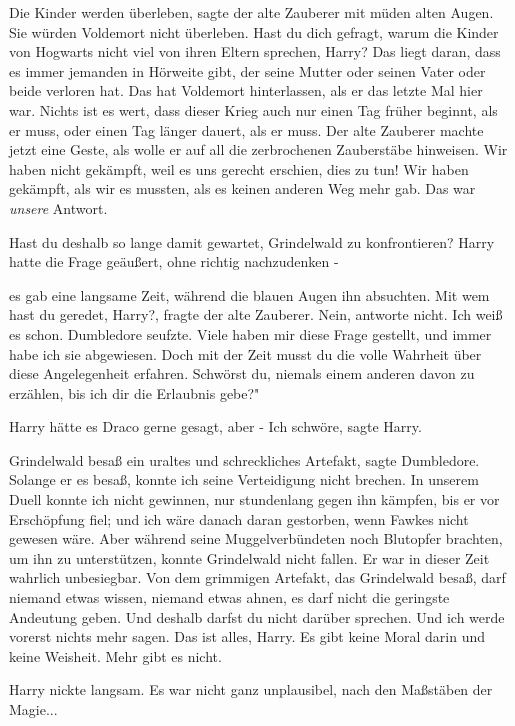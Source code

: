 \glqq Die Kinder werden überleben\grqq{}, sagte der alte Zauberer mit müden
alten Augen. \glqq Sie würden Voldemort nicht überleben. Hast du dich gefragt,
warum die Kinder von Hogwarts nicht viel von ihren Eltern sprechen, Harry? Das
liegt daran, dass es immer jemanden in Hörweite gibt, der seine Mutter oder
seinen Vater oder beide verloren hat. Das hat Voldemort hinterlassen, als er das
letzte Mal hier war. Nichts ist es wert, dass dieser Krieg auch nur einen Tag
früher beginnt, als er muss, oder einen Tag länger dauert, als er muss.\grqq{}
Der alte Zauberer machte jetzt eine Geste, als wolle er auf all die zerbrochenen
Zauberstäbe hinweisen. \glqq Wir haben nicht gekämpft, weil es uns gerecht
erschien, dies zu tun! Wir haben gekämpft, als wir es mussten, als es keinen
anderen Weg mehr gab. Das war \emph{unsere} Antwort.\grqq{}

\glqq Hast du deshalb so lange damit gewartet, Grindelwald zu
konfrontieren?\grqq{} Harry hatte die Frage geäußert, ohne richtig nachzudenken
-

es gab eine langsame Zeit, während die blauen Augen ihn absuchten. \glqq Mit wem
hast du geredet, Harry?\grqq{}, fragte der alte Zauberer. \glqq Nein, antworte
nicht. Ich weiß es schon.\grqq{} Dumbledore seufzte. \glqq Viele haben mir diese
Frage gestellt, und immer habe ich sie abgewiesen. Doch mit der Zeit musst du
die volle Wahrheit über diese Angelegenheit erfahren. Schwörst du, niemals einem
anderen davon zu erzählen, bis ich dir die Erlaubnis gebe?"

Harry hätte es Draco gerne gesagt, aber - \glqq Ich schwöre\grqq{}, sagte Harry.

\glqq Grindelwald besaß ein uraltes und schreckliches Artefakt\grqq{}, sagte
Dumbledore. \glqq Solange er es besaß, konnte ich seine Verteidigung nicht
brechen. In unserem Duell konnte ich nicht gewinnen, nur stundenlang gegen ihn
kämpfen, bis er vor Erschöpfung fiel; und ich wäre danach daran gestorben, wenn
Fawkes nicht gewesen wäre. Aber während seine Muggelverbündeten noch Blutopfer
brachten, um ihn zu unterstützen, konnte Grindelwald nicht fallen. Er war in
dieser Zeit wahrlich unbesiegbar. Von dem grimmigen Artefakt, das Grindelwald
besaß, darf niemand etwas wissen, niemand etwas ahnen, es darf nicht die
geringste Andeutung geben. Und deshalb darfst du nicht darüber sprechen. Und ich
werde vorerst nichts mehr sagen. Das ist alles, Harry. Es gibt keine Moral darin
und keine Weisheit. Mehr gibt es nicht.\grqq{}

Harry nickte langsam. Es war nicht ganz unplausibel, nach den Maßstäben der
Magie...

